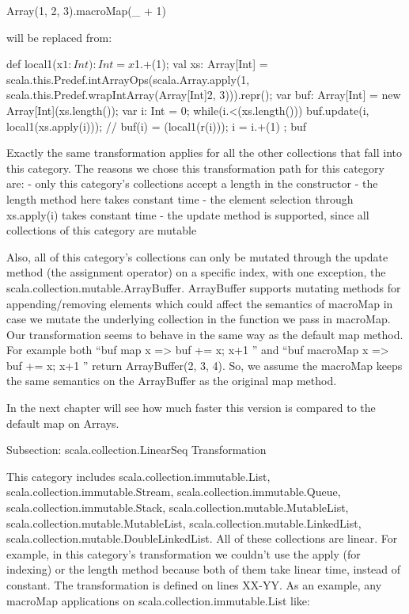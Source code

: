 Array(1, 2, 3).macroMap(_ + 1)

will be replaced from:

{
  def local1(x$1: Int): Int = x$1.+(1);
  val xs: Array[Int] = scala.this.Predef.intArrayOps(scala.Array.apply(1,
scala.this.Predef.wrapIntArray(Array[Int]{2, 3}))).repr();
  var buf: Array[Int] = new Array[Int](xs.length());
  var i: Int = 0;
  while(i.<(xs.length())){
    buf.update(i, local1(xs.apply(i))); // buf(i) = (local1(r(i)));
    i = i.+(1)
  };
  buf
}

Exactly the same transformation applies for all the other collections that fall
into this category. The reasons we chose this transformation path for this
category are:
- only this category's collections accept a length in the constructor
- the length method here takes constant time
- the element selection through xs.apply(i) takes constant time
- the update method is supported, since all collections of this category are
mutable

Also, all of this category's collections can only be mutated through the
update method (the assignment operator) on a specific index, with one
exception, the scala.collection.mutable.ArrayBuffer. ArrayBuffer supports
mutating methods for appending/removing elements which could affect the
semantics of macroMap in case we mutate the underlying collection in the
function we pass in macroMap. Our transformation seems to behave in the same
way as the default map method. For example both ``buf map {
x => buf += x; x+1 }'' and ``buf macroMap { x => buf += x;
x+1 }'' return ArrayBuffer(2, 3, 4). So, we assume the macroMap keeps the
same semantics on the ArrayBuffer as the original map method.

In the next chapter will see how much faster this version is compared to the
default map on Arrays.

Subsection: scala.collection.LinearSeq Transformation

This category includes scala.collection.immutable.List,
scala.collection.immutable.Stream, scala.collection.immutable.Queue,
scala.collection.immutable.Stack, scala.collection.mutable.MutableList,
scala.collection.mutable.MutableList, scala.collection.mutable.LinkedList,
scala.collection.mutable.DoubleLinkedList. All of these collections are linear.
For example, in this category's transformation we couldn't use the apply (for
indexing) or the length method because both of them take linear time, instead of
constant. The transformation is defined on lines XX-YY. As an example, any
macroMap applications on scala.collection.immutable.List like:

